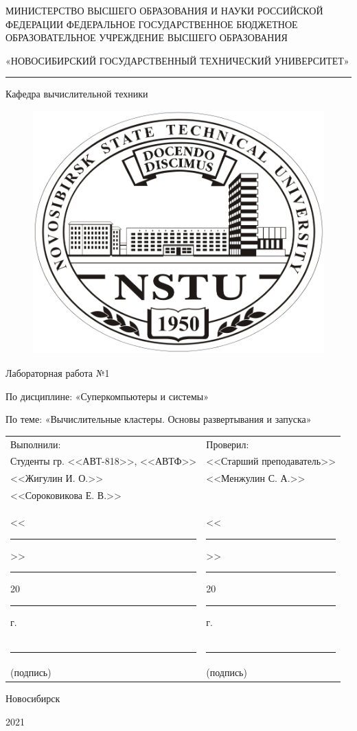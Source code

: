 \thispagestyle{empty}
\begin{center}

МИНИСТЕРСТВО ВЫСШЕГО ОБРАЗОВАНИЯ И НАУКИ РОССИЙСКОЙ ФЕДЕРАЦИИ
ФЕДЕРАЛЬНОЕ ГОСУДАРСТВЕННОЕ БЮДЖЕТНОЕ
ОБРАЗОВАТЕЛЬНОЕ УЧРЕЖДЕНИЕ
ВЫСШЕГО ОБРАЗОВАНИЯ

«НОВОСИБИРСКИЙ ГОСУДАРСТВЕННЫЙ ТЕХНИЧЕСКИЙ УНИВЕРСИТЕТ»

\noindent\rule{\textwidth}{0.4pt}

Кафедра вычислительной техники

\begin{figure}[H]
	\centering
	\includegraphics{title/logo.jpeg}
\end{figure}

Лабораторная работа №1

По дисциплине: «Суперкомпьютеры и системы»

По теме: «Вычислительные кластеры. Основы развертывания и запуска»

\end{center}

\noindent\begin{tabular}{p{}p{}}
	Выполнили: & Проверил: \\
	Студенты гр. <<АВТ-818>>, <<АВТФ>> & <<Старший преподаватель>>\\
	<<Жигулин И. О.>> & <<Менжулин С. А.>> \\
	<<Сороковикова Е. В.>> & \\
	<<\rule{1.5em}{0.4pt}>> \rule{5em}{0.4pt} 20\rule{1.5em}{0.4pt}г. & <<\rule{1.5em}{0.4pt}>> \rule{5em}{0.4pt} 20\rule{1.5em}{0.4pt}г.\\
	\rule{7.5em}{0.4pt} & \rule{7.5em}{0.4pt} \\
	\hspace{1.5em}(подпись) & \hspace{1.5em}(подпись)
\end{tabular}


\begin{center}

\vspace{2.5cm}

Новосибирск

2021
\end{center}
